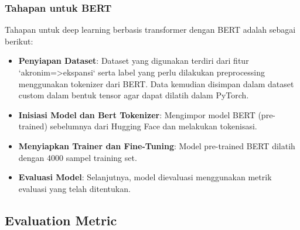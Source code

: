 \documentclass{article}\usepackage{float}
\begin{document}
\subsubsection*{Tahapan untuk BERT}
Tahapan untuk deep learning berbasis transformer dengan BERT adalah sebagai berikut:
\begin{itemize}
    \item \textbf{Penyiapan Dataset}: Dataset yang digunakan terdiri dari fitur `akronim=>ekspansi` serta label yang perlu dilakukan preprocessing menggunakan tokenizer dari BERT. Data kemudian disimpan dalam dataset custom dalam bentuk tensor agar dapat dilatih dalam PyTorch.
    \item \textbf{Inisiasi Model dan Bert Tokenizer}: Mengimpor model BERT (pre-trained) sebelumnya dari Hugging Face dan melakukan tokenisasi.
    \item \textbf{Menyiapkan Trainer dan Fine-Tuning}: Model pre-trained BERT dilatih dengan 4000 sampel training set.
    \item \textbf{Evaluasi Model}: Selanjutnya, model dievaluasi menggunakan metrik evaluasi yang telah ditentukan.
\end{itemize}

\subsection{Evaluation Metric}
\end{document}
